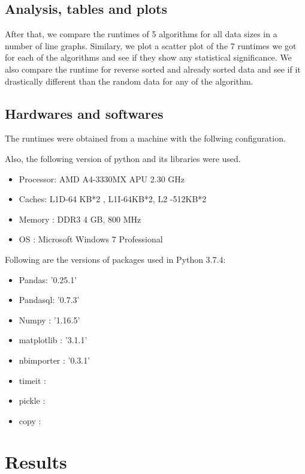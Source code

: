 \documentclass[sigconf,  natbib, screen]{acmart}
\begin{document}
\subsection{Analysis, tables and plots}\label{sec:analysis}
After that, we compare the runtimes of 5 algorithms for all data sizes in a number of line graphs. Similary, we plot a scatter plot of the 7 runtimes 
we got for each of the algorithms and see if they show any statistical significance. We also compare the runtime for reverse sorted and already sorted data and see if it drastically different than the random data for any of the algorithm.

\subsection{Hardwares and softwares}\label{sec:hardwares and softwares}
The runtimes were obtained from a machine with the follwing configuration. 

Also, the following version of python and its libraries were used.
\begin{itemize}
\item Processor:    AMD A4-3330MX APU  2.30 GHz
\item Caches:        L1D-64 KB*2 , L1I-64KB*2, L2 -512KB*2
\item Memory :      DDR3 4 GB, 800 MHz
\item OS :              Microsoft Windows 7 Professional
\end{itemize}


Following are the versions of packages used in Python 3.7.4:
\begin{multicols}{2}
\begin{itemize}
\item Pandas:    '0.25.1'
\item Pandasql:    '0.7.3'
\item Numpy :      '1.16.5'
\item matplotlib :   '3.1.1'
\item nbimporter :  '0.3.1'
\item timeit :         
\item pickle :       
\item copy :        
\end{itemize}
\end{multicols}


\section{Results}\label{sec:results}
\end{document}

